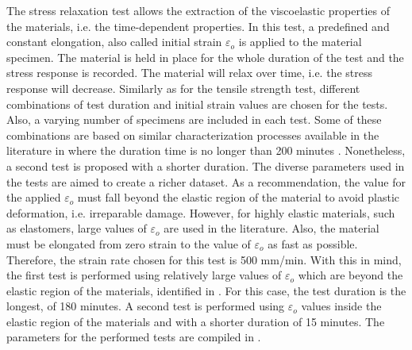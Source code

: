 The stress relaxation test allows the extraction of the viscoelastic properties of the materials, i.e. the time-dependent properties. In this test, a predefined and constant elongation, also called initial strain $\varepsilon_o$ is applied to the material specimen. The material is held in place for the whole duration of the test and the stress response is recorded. The material will relax over time, i.e. the stress response will decrease. Similarly as for the tensile strength test, different combinations of test duration and initial strain values are chosen for the tests. Also, a varying number of specimens are included in each test. Some of these combinations are based on similar characterization processes available in the literature in where the duration time is no longer than 200 minutes \cite{case2015soft,delin1995volume}. Nonetheless, a second test is proposed with a shorter duration. The diverse parameters used in the tests are aimed to create a richer dataset. As a recommendation, the value for the applied $\varepsilon_o$ must fall beyond the elastic region of the material to avoid plastic deformation, i.e. irreparable damage. However, for highly elastic materials, such as elastomers, large values of $\varepsilon_o$ are used in the literature. Also, the material must be elongated from zero strain to the value of $\varepsilon_o$ as fast as possible. Therefore, the strain rate chosen for this test is  500 mm/min. With this in mind, the first test is performed using relatively large values of $\varepsilon_o$ which are beyond the elastic region of the materials, identified in . For this case, the test duration is the longest, of 180 minutes. A second test is performed using $\varepsilon_o$ values inside the elastic region of the materials and with a shorter duration of 15 minutes. The parameters for the performed tests are compiled in .

